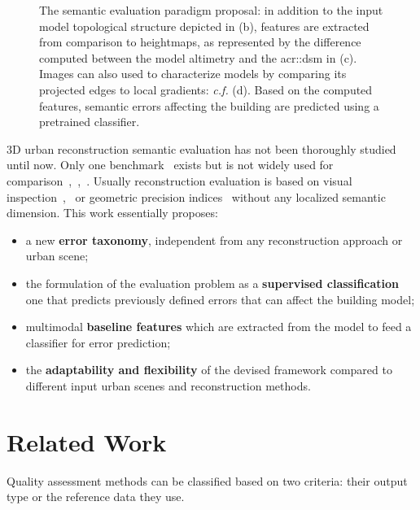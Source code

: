 \documentclass[runningheads]{llncs}
\begin{document}
    \begin{figure}
        \begin{center}
            
            \caption{\label{fig::pipeline} The semantic evaluation paradigm proposal: in addition to the input model topological structure depicted in (b), features are extracted from comparison to heightmaps, as represented by the difference computed between the model altimetry and the \acrshort{acr::dsm} in (c). Images can also used to characterize models by comparing its projected edges to local gradients: \textit{c.f.} (d). Based on the computed features, semantic errors affecting the building are predicted using a pretrained classifier.}
        \end{center}
    \end{figure}

     3D urban reconstruction semantic evaluation has not been thoroughly studied until now. Only one benchmark~\cite{rottensteiner2014results} exists but is not widely used for comparison~\cite{lafarge2012creating},~\cite{nguatem2017modeling},~\cite{li2016boxfitting}. Usually reconstruction evaluation is based on visual inspection~\cite{Durupt2006},~\cite{MacayMoreia2013} or geometric precision indices~\cite{Kaartinen2005} without any localized semantic dimension. This work essentially proposes:
    \begin{itemize}
        \item a new \textbf{error taxonomy}, independent from any reconstruction approach or urban scene;
        \item the formulation of the evaluation problem as a \textbf{supervised classification} one that predicts previously defined errors that can affect the building model;
        \item multimodal \textbf{baseline features} which are extracted from the model to feed a classifier for error prediction;
        \item the \textbf{adaptability and flexibility} of the devised framework compared to different input urban scenes and reconstruction methods.
    \end{itemize}

\section{Related Work}

Quality assessment methods can be classified based on two criteria: their output type or the reference data they use.
\end{document}

